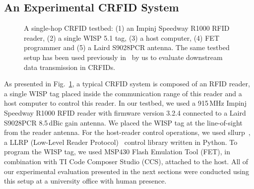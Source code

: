 \documentclass[10pt,journal,compsoc]{IEEEtran}
\begin{document}
\subsection{\label{sec:testbed}An Experimental CRFID System}


\begin{figure}
	\centering
	\caption{\label{fig:crfid_testbed} A single-hop CRFID testbed: (1) an Impinj Speedway R1000 RFID reader, (2) a single WISP 5.1 tag, (3) a host computer, (4) FET programmer and (5) a Laird S9028PCR antenna. The same testbed setup has been used previously in~\cite{wisent:2016} by us to evaluate downstream data transmission in CRFIDs.}
\end{figure}

As presented in Fig.~\ref{fig:crfid_testbed}, a typical CRFID system is composed of an RFID reader, a single WISP tag placed inside the communication range of this reader and a host computer to control this reader. In our testbed, we used a 915\,MHz Impinj Speedway R1000 RFID reader with firmware version 3.2.4 connected to a Laird S9028PCR 8.5\,dBic gain antenna. We placed the WISP tag at the line-of-sight from the reader antenna. For the host-reader control operations, we used sllurp~\cite{sllrp_github}, a LLRP (Low-Level Reader Protocol)~\cite{llrp}  control library written in Python.  To program the WISP tag, we used MSP430 Flash Emulation Tool (FET), in combination with TI Code Composer Studio (CCS), attached to the host.  All of our experimental evaluation presented in the next sections were conducted using this setup at a university office with human presence.
\end{document}
